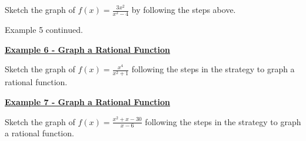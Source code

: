 \documentclass[12pt]{book}
\newcommand{\D}{\displaystyle}
\begin{document}
\vspace{1mm}

Sketch the graph of $\D f(x)= \frac{3x^2}{x^2-4}$ by following the steps above. 

\newpage
Example 5 continued.


\newpage
\underline{\textbf{Example 6 - Graph a Rational Function}}

\vspace{1mm}

Sketch the graph of $\D f(x)= \frac{x^4}{x^2+1}$ following the steps in the strategy to graph a rational function.
\newpage

\underline{\textbf{Example 7 - Graph a Rational Function}}
\vspace{1mm}

Sketch the graph of $\D f(x)= \frac{x^2+x-30}{x-6}$ following the steps in the strategy to graph a rational function.
\newpage
\end{document}
